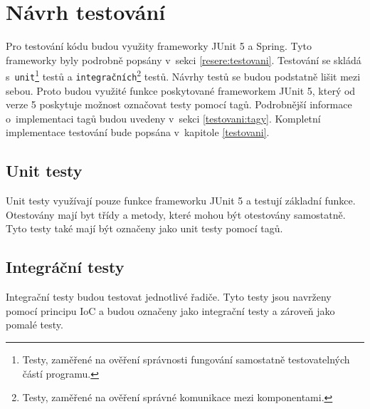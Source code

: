     
\section{Návrh testování}\label{navrh:testovani}
    Pro testování kódu budou využity frameworky JUnit 5 a Spring. Tyto frameworky byly podrobně popsány v~sekci \ref{resere:testovani}. Testování se skládá s~\texttt{unit}\footnote{Testy, zaměřené na ověření správnosti fungování samostatně testovatelných částí programu.} testů a \texttt{integračních}\footnote{Testy, zaměřené na ověření správné komunikace mezi komponentami.} testů. Návrhy testů se budou podstatně lišit mezi sebou. Proto budou využité funkce poskytované frameworkem JUnit 5, který od verze 5 poskytuje možnost označovat testy pomocí tagů\cite{junit-tags}. Podrobnější informace o~implementaci tagů budou uvedeny v~sekci \ref{testovani:tagy}. Kompletní implementace testování bude popsána v~kapitole \ref{testovani}.
    
    \subsection{Unit testy}
        Unit testy využívají pouze funkce frameworku JUnit 5 a testují základní funkce. Otestovány mají byt třídy a metody, které mohou být otestovány samostatně. Tyto testy také mají být označeny jako unit testy pomocí tagů.  %
        
    \subsection{Integráční testy}
        Integrační testy budou testovat jednotlivé řadiče. Tyto testy jsou navrženy pomocí principu IoC a budou označeny jako integrační testy a zároveň jako pomalé testy.
